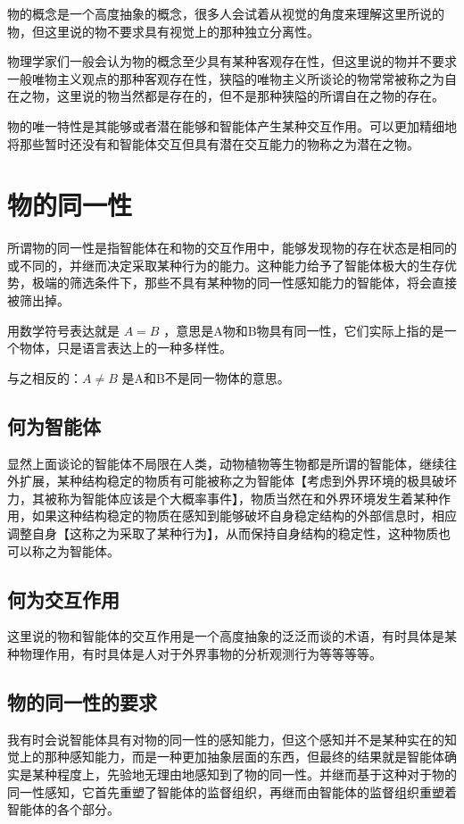 \documentclass[12pt,oneside]{book}
\begin{document}
物的概念是一个高度抽象的概念，很多人会试着从视觉的角度来理解这里所说的物，但这里说的物不要求具有视觉上的那种独立分离性。

物理学家们一般会认为物的概念至少具有某种客观存在性，但这里说的物并不要求一般唯物主义观点的那种客观存在性，狭隘的唯物主义所谈论的物常常被称之为自在之物，这里说的物当然都是存在的，但不是那种狭隘的所谓自在之物的存在。

物的唯一特性是其能够或者潜在能够和智能体产生某种交互作用。可以更加精细地将那些暂时还没有和智能体交互但具有潜在交互能力的物称之为潜在之物。

\chapter{物的同一性}
所谓物的同一性是指智能体在和物的交互作用中，能够发现物的存在状态是相同的或不同的，并继而决定采取某种行为的能力。这种能力给予了智能体极大的生存优势，极端的筛选条件下，那些不具有某种物的同一性感知能力的智能体，将会直接被筛出掉。

用数学符号表达就是 $A=B$ ，意思是A物和B物具有同一性，它们实际上指的是一个物体，只是语言表达上的一种多样性。

与之相反的：$A \neq B$ 是A和B不是同一物体的意思。


\section{何为智能体}
显然上面谈论的智能体不局限在人类，动物植物等生物都是所谓的智能体，继续往外扩展，某种结构稳定的物质有可能被称之为智能体【考虑到外界环境的极具破坏力，其被称为智能体应该是个大概率事件】，物质当然在和外界环境发生着某种作用，如果这种结构稳定的物质在感知到能够破坏自身稳定结构的外部信息时，相应调整自身【这称之为采取了某种行为】，从而保持自身结构的稳定性，这种物质也可以称之为智能体。


\section{何为交互作用}
这里说的物和智能体的交互作用是一个高度抽象的泛泛而谈的术语，有时具体是某种物理作用，有时具体是人对于外界事物的分析观测行为等等等等。


\section{物的同一性的要求}
我有时会说智能体具有对物的同一性的感知能力，但这个感知并不是某种实在的知觉上的那种感知能力，而是一种更加抽象层面的东西，但最终的结果就是智能体确实是某种程度上，先验地无理由地感知到了物的同一性。并继而基于这种对于物的同一性感知，它首先重塑了智能体的监督组织，再继而由智能体的监督组织重塑着智能体的各个部分。
\end{document}
